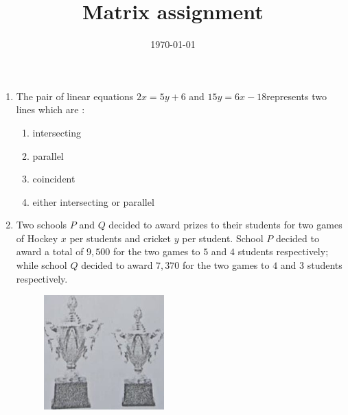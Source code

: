 \documentclass[12pt,-letter paper]{article}
\title{Matrix assignment}
\date{\today}
\begin{document}
\begin{enumerate}
	\item The pair of linear equations $ 2x=5y+6 $ and $ 15y=6x-18 $represents two lines which are : 
\begin{enumerate}
    \item intersecting
    \item parallel
    \item coincident
    \item either intersecting or parallel
\end{enumerate}
\item Two schools $P$ and $Q$ decided to award prizes to their students for two games of Hockey \rupee $x$ per students and cricket \rupee $y$ per student. School $P$
decided to award a total of \rupee $9,500$ for the two games to $5$ and $4$ students respectively; while school $Q$ decided to award \rupee $7,370$ for the two games to $4$ and $3$ students respectively.
\begin{figure}[!ht]
    \centering
    \includegraphics[width=\columnwidth]{math.png}
    \label{prizes}
\end{figure}



\end{enumerate}
\end{document}
